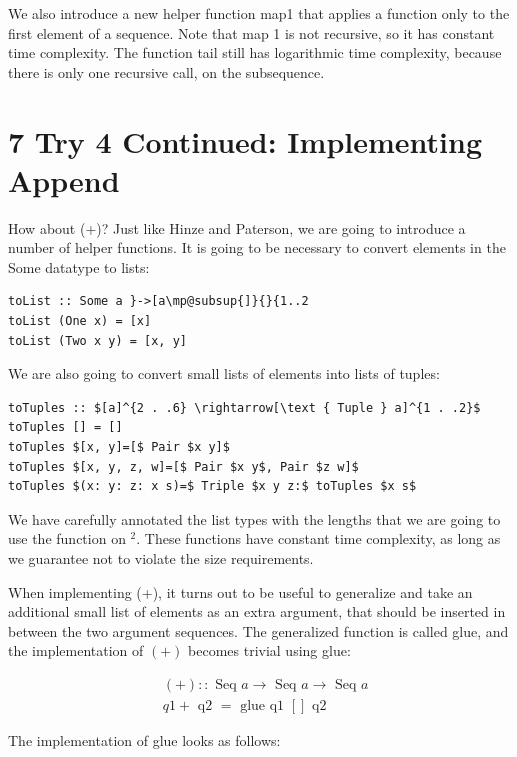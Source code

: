 \documentclass[10pt]{article}
\begin{document}
We also introduce a new helper function map1 that applies a function only to the first element of a sequence. Note that map 1 is not recursive, so it has constant time complexity. The function tail still has logarithmic time complexity, because there is only one recursive call, on the subsequence.

\section*{7 Try 4 Continued: Implementing Append}
How about (+)? Just like Hinze and Paterson, we are going to introduce a number of helper functions. It is going to be necessary to convert elements in the Some datatype to lists:

\begin{verbatim}
toList :: Some a }->[a\mp@subsup{]}{}{1..2
toList (One x) = [x]
toList (Two x y) = [x, y]
\end{verbatim}

We are also going to convert small lists of elements into lists of tuples:

\begin{verbatim}
toTuples :: $[a]^{2 . .6} \rightarrow[\text { Tuple } a]^{1 . .2}$
toTuples [] = []
toTuples $[x, y]=[$ Pair $x y]$
toTuples $[x, y, z, w]=[$ Pair $x y$, Pair $z w]$
toTuples $(x: y: z: x s)=$ Triple $x y z:$ toTuples $x s$
\end{verbatim}

We have carefully annotated the list types with the lengths that we are going to use the function on ${ }^{2}$. These functions have constant time complexity, as long as we guarantee not to violate the size requirements.

When implementing (+), it turns out to be useful to generalize and take an additional small list of elements as an extra argument, that should be inserted in between the two argument sequences. The generalized function is called glue, and the implementation of $(+)$ becomes trivial using glue:

$$
\begin{aligned}
& (+):: \text { Seq } a \rightarrow \text { Seq } a \rightarrow \text { Seq } a \\
& q 1+\text { q2 }=\text { glue q1 }[] \text { q2 }
\end{aligned}
$$

The implementation of glue looks as follows:
\end{document}
